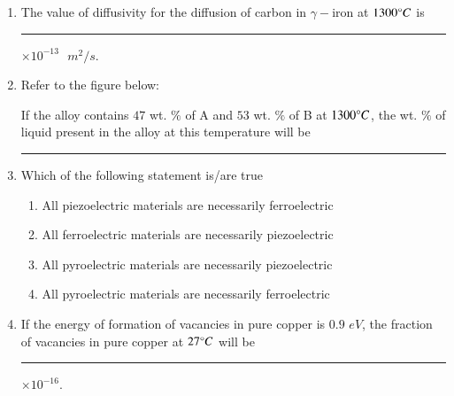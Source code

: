 \documentclass[journal,12pt,onecolumn]{IEEEtran}
\theoremstyle{remark}
\begin{document}
\begin{enumerate}
\item The value of diffusivity  for the diffusion of carbon  in $\gamma-$iron at $1300\degree C$ is \rule{2.5cm}{0.4pt}$\times 10^{-13}\text{ }m^2/s$. 

\hfill{}

\item Refer to the figure below:
\\\begin{center}
   \scalebox{0.5}{}
\end{center}
If the alloy contains $47$ wt. $\%$ of A and $53$ wt. $\%$ of B at $1300\degree C$, the wt. $\%$ of liquid present in the alloy at this temperature will be \rule{2.5cm}{0.4pt}

\hfill{}

\item Which of the following statement is/are true

\begin{enumerate}[label=(\roman*)]
    \item All piezoelectric materials are necessarily ferroelectric
    \item All ferroelectric materials are necessarily piezoelectric
    \item All pyroelectric materials are necessarily piezoelectric
    \item All pyroelectric materials are necessarily ferroelectric
\end{enumerate}

\hfill{}
\begin{enumerate}
\end{enumerate}


\item If the energy of formation of vacancies in pure copper is $0.9$ $eV$, the fraction of vacancies in pure copper at $27\degree C$ will be \rule{2.5cm}{0.4pt}$\times 10^{-16}$. 


\end{enumerate}
\end{document}
